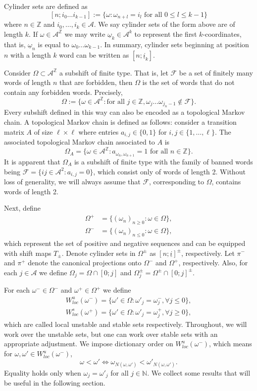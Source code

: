 \documentclass{amsart}
\newcommand{\NN}{\mathbb{N}}
\newcommand{\ZZ}{\mathbb{Z}}
\newcommand{\A}{\mathcal{A}}
\newcommand{\F}{\mathcal{F}}
\begin{document}
Cylinder sets are defined as
\[[n;i_0\dots i_{k-1}] := \{\omega: \omega_{n+l} = i_l \text{ for all } 0\leq l \leq k-1\}\]
where $n\in \ZZ$ and $i_0,\dots, i_k\in \A$. We say cylinder sets of the form above are of length $k$. If $\omega\in \A^\ZZ$ we may write $\underline{\omega}_k\in \A^k$ to represent the first $k$-coordinates, that is, $\underline{\omega}_n$ is equal to $\omega_0\dots \omega_{k-1}$. In summary, cylinder sets beginning at position $n$ with a length $k$ word can be written as $[n;\underline{i}_k]$.

Consider $\Omega \subset \A^\ZZ$ a subshift of finite type. That is, let $\F$ be a set of finitely many words of length $n$ that are forbidden, then $\Omega$ is the set of words that do not contain any forbidden words. Precisely,
\[\Omega:= \{\omega\in \A^\ZZ: \text{for all } j\in \ZZ, \omega_{j}\dots\omega_{j_n-1}\notin \F\}.\]
Every subshift defined in this way can also be encoded as a topological Markov chain. A topological Markov chain is defined as follows: consider a transition matrix $A$ of size $\ell\times \ell$ where entries $a_{i,j} \in \{0,1\}$ for $i,j\in \{1,\dots, \ell\}$. The associated topological Markov chain associated to $A$ is 
\[\Omega_A = \{\omega\in \A^\ZZ: a_{\omega_n,\omega_{n+1}} = 1 \text{ for all } n\in \ZZ\}.\]
It is apparent that $\Omega_A$ is a subshift of finite type with the family of banned words being $\F = \{ij\in \A^2: a_{i,j} = 0\}$, which consist only of words of length 2. Without loss of generality, we will always assume that $\F$, corresponding to $\Omega$, contains words of length 2.

Next, define 
\begin{align*}
    \Omega^+ &= \{(\omega_n)_{n \geq 0}: \omega\in \Omega\},\\
    \Omega^- &= \{(\omega_n)_{n \leq 0}: \omega\in \Omega\},
\end{align*}
which represent the set of positive and negative sequences and can be equipped with shift maps $T_\pm$. Denote cylinder sets in $\Omega^\pm$ as $[n;\underline{i}]^\pm$, respectively. Let $\pi^-$ and $\pi^+$ denote the canonical projections onto $\Omega^-$ and $\Omega^+$, respectively. Also, for each $j\in \A$ we define $\Omega_j = \Omega\cap [0;j]$ and $\Omega^\pm_j = \Omega^\pm \cap [0;j]^\pm$.

For each $\omega^-\in \Omega^-$ and $\omega^+\in \Omega^+$ we define
\begin{align*}
    W^{u}_{loc}(\omega^-) = \{\omega'\in \Omega: \omega'_j = \omega_j^-, \forall j\leq 0\},\\
    W^{s}_{loc}(\omega^+) = \{\omega'\in \Omega: \omega'_j = \omega_j^+, \forall j\geq 0\},
\end{align*}
which are called local unstable and stable sets respectively. Throughout, we will work over the unstable sets, but one can work over stable sets with an appropriate adjustment. We impose dictionary order on $W^u_{loc}(\omega^-)$, which means for $\omega,\omega'\in W^u_{loc}(\omega^-)$,
\[\omega < \omega' \iff \omega_{N(\omega, \omega')} < \omega'_{N(\omega,\omega')}.\]
Equality holds only when $\omega_j = \omega'_j$ for all $j\in \NN$. We collect some results that will be useful in the following section.
\end{document}
